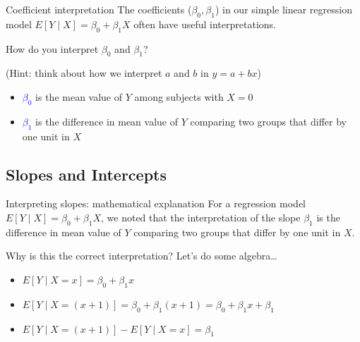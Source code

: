 \documentclass[10pt,t]{beamer}
\begin{document}
\begin{frame}{Coefficient interpretation}
The coefficients ($\beta_0, \beta_1$) in our simple linear regression model $E[Y \mid X] = \beta_0 + \beta_1 X$ often have useful interpretations.

\vspace{0.3cm} 

How do you interpret $\beta_0$ and $\beta_1$?

\vspace{0.3cm} 

\small (Hint: think about how we interpret $a$ and $b$ in $y = a + bx$)

\normalsize 
\vspace{0.3cm} 

\begin{itemize}
	\item \textcolor{blue}{$\beta_0$} is the mean value of $Y$ among subjects with $X = 0$
	\item \textcolor{blue}{$\beta_1$} is the difference in mean value of $Y$ comparing two groups that differ by one unit in $X$
\end{itemize}

\end{frame}

\subsection{Slopes and Intercepts}

\begin{frame}{Interpreting slopes: mathematical explanation}
For a regression model $E[Y \mid X] = \beta_0 + \beta_1 X$, we noted that the interpretation of the slope $\beta_1$ is the difference in mean value of $Y$ comparing two groups that differ by one unit in $X$. 

\vspace{0.3cm}

Why is this the correct interpretation? Let's do some algebra\dots \pause

\vspace{0.3cm}

\begin{itemize}
	\item $E[Y \mid X = x] = \beta_0 + \beta_1 x$ \pause
	\item $E[Y \mid X = (x + 1)] = \beta_0 + \beta_1 (x + 1) = \beta_0 + \beta_1 x + \beta_1$ \pause
	\item $E[Y \mid X = (x + 1)] - E[Y \mid X = x] = \beta_1$ 
\end{itemize}

\end{frame}
\end{document}
